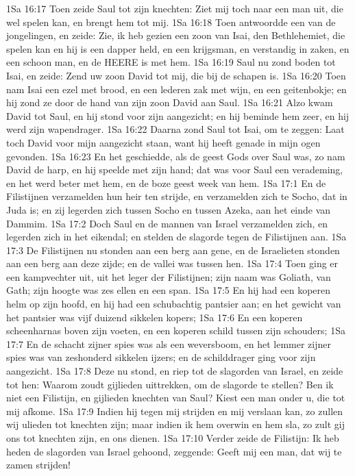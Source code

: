 1Sa 16:17  Toen zeide Saul tot zijn knechten: Ziet mij toch naar een man uit, die wel spelen kan, en brengt hem tot mij.
1Sa 16:18  Toen antwoordde een van de jongelingen, en zeide: Zie, ik heb gezien een zoon van Isai, den Bethlehemiet, die spelen kan en hij is een dapper held, en een krijgsman, en verstandig in zaken, en een schoon man, en de HEERE is met hem.
1Sa 16:19  Saul nu zond boden tot Isai, en zeide: Zend uw zoon David tot mij, die bij de schapen is.
1Sa 16:20  Toen nam Isai een ezel met brood, en een lederen zak met wijn, en een geitenbokje; en hij zond ze door de hand van zijn zoon David aan Saul.
1Sa 16:21  Alzo kwam David tot Saul, en hij stond voor zijn aangezicht; en hij beminde hem zeer, en hij werd zijn wapendrager.
1Sa 16:22  Daarna zond Saul tot Isai, om te zeggen: Laat toch David voor mijn aangezicht staan, want hij heeft genade in mijn ogen gevonden.
1Sa 16:23  En het geschiedde, als de geest Gods over Saul was, zo nam David de harp, en hij speelde met zijn hand; dat was voor Saul een verademing, en het werd beter met hem, en de boze geest week van hem.
1Sa 17:1  En de Filistijnen verzamelden hun heir ten strijde, en verzamelden zich te Socho, dat in Juda is; en zij legerden zich tussen Socho en tussen Azeka, aan het einde van Dammim.
1Sa 17:2  Doch Saul en de mannen van Israel verzamelden zich, en legerden zich in het eikendal; en stelden de slagorde tegen de Filistijnen aan.
1Sa 17:3  De Filistijnen nu stonden aan een berg aan gene, en de Israelieten stonden aan een berg aan deze zijde; en de vallei was tussen hen.
1Sa 17:4  Toen ging er een kampvechter uit, uit het leger der Filistijnen; zijn naam was Goliath, van Gath; zijn hoogte was zes ellen en een span.
1Sa 17:5  En hij had een koperen helm op zijn hoofd, en hij had een schubachtig pantsier aan; en het gewicht van het pantsier was vijf duizend sikkelen kopers;
1Sa 17:6  En een koperen scheenharnas boven zijn voeten, en een koperen schild tussen zijn schouders;
1Sa 17:7  En de schacht zijner spies was als een weversboom, en het lemmer zijner spies was van zeshonderd sikkelen ijzers; en de schilddrager ging voor zijn aangezicht.
1Sa 17:8  Deze nu stond, en riep tot de slagorden van Israel, en zeide tot hen: Waarom zoudt gijlieden uittrekken, om de slagorde te stellen? Ben ik niet een Filistijn, en gijlieden knechten van Saul? Kiest een man onder u, die tot mij afkome.
1Sa 17:9  Indien hij tegen mij strijden en mij verslaan kan, zo zullen wij ulieden tot knechten zijn; maar indien ik hem overwin en hem sla, zo zult gij ons tot knechten zijn, en ons dienen.
1Sa 17:10  Verder zeide de Filistijn: Ik heb heden de slagorden van Israel gehoond, zeggende: Geeft mij een man, dat wij te zamen strijden!
